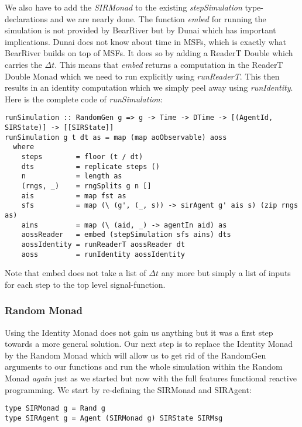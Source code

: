 We also have to add the \textit{SIRMonad} to the existing \textit{stepSimulation} type-declarations and we are nearly done. The function \textit{embed} for running the simulation is not provided by BearRiver but by Dunai which has important implications. Dunai does not know about time in MSFs, which is exactly what BearRiver builds on top of MSFs. It does so by adding a ReaderT Double which carries the $\Delta t$. This means that \textit{embed} returns a computation in the ReaderT Double Monad which we need to run explicitly using \textit{runReaderT}. This then results in an identity computation which we simply peel away using \textit{runIdentity}. Here is the complete code of \textit{runSimulation}:

\begin{verbatim}
runSimulation :: RandomGen g => g -> Time -> DTime -> [(AgentId, SIRState)] -> [[SIRState]]
runSimulation g t dt as = map (map aoObservable) aoss
  where
    steps        = floor (t / dt)
    dts          = replicate steps ()
    n            = length as
    (rngs, _)    = rngSplits g n []
    ais          = map fst as
    sfs          = map (\ (g', (_, s)) -> sirAgent g' ais s) (zip rngs as)
    ains         = map (\ (aid, _) -> agentIn aid) as
    aossReader   = embed (stepSimulation sfs ains) dts
    aossIdentity = runReaderT aossReader dt
    aoss         = runIdentity aossIdentity
\end{verbatim}

Note that embed does not take a list of $\Delta t$ any more but simply a list of inputs for each step to the top level signal-function.

\subsubsection{Random Monad}
Using the Identity Monad does not gain us anything but it was a first step towards a more general solution. Our next step is to replace the Identity Monad by the Random Monad which will allow us to get rid of the RandomGen arguments to our functions and run the whole simulation within the Random Monad \textit{again} just as we started but now with the full features functional reactive programming.
We start by re-defining the SIRMonad and SIRAgent:

\begin{verbatim}
type SIRMonad g = Rand g
type SIRAgent g = Agent (SIRMonad g) SIRState SIRMsg
\end{verbatim}

